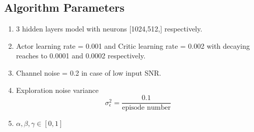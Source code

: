 \subsection{Algorithm Parameters}
\begin{enumerate}
    \item 3 hidden layers model with neurons [1024,512,] respectively.
    \item Actor learning rate = 0.001 and Critic learning rate = 0.002 with decaying reaches to 0.0001 and 0.0002 respectively.
    \item Channel noise = 0.2 in case of low input SNR.
    \item Exploration noise variance \[ \sigma^2_\epsilon = \frac{0.1}{\text{episode number}} \]
    \item $\alpha, \beta, \gamma \in [0,1]$
\end{enumerate}